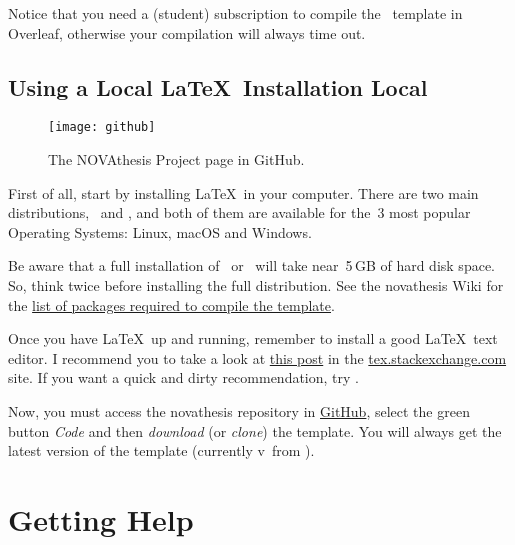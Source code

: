 \begin{tcolorbox}[colback=red!8]
	Notice that you need a (student) subscription to compile the \novathesis\ template in Overleaf, otherwise your compilation will always time out.
\end{tcolorbox}

\subsection{Using a Local \LaTeX\ Installation Local}
\label{sub:using_local_latex}


\begin{wrapfigure}{r}{0.3\linewidth}
\vspace*{-7ex}
\texttt{[image: github]}%
\caption{The NOVAthesis Project page in GitHub.}
\label{fig:github2}
\end{wrapfigure}

First of all, start by installing \LaTeX\ in your computer.  There are two main distributions, \href{https://miktex.org}{\ntindex{\MikTeX}}\ and \href{https://www.tug.org/texlive/}{\ntindex{\TeXLive}}, and both of them are available for the~3 most popular Operating Systems: Linux, macOS and Windows.

Be aware that a full installation of \MikTeX\ or \TeXLive\ will take near~5\,GB of hard disk space.  So, think twice before installing the full distribution.  See the \gls{novathesis} Wiki for the \href{https://github.com/joaomlourenco/novathesis/wiki/installing-latex#minimal-installation-in-any-of-the-systems-above}{list of packages required to compile the template}.

Once you have \LaTeX\ up and running, remember to install a good \LaTeX\ text editor.  I recommend you to take a look at  \href{https://tex.stackexchange.com/questions/339/latex-editors-ides}{this post} in the \url{tex.stackexchange.com} site.  If you want a quick and dirty recommendation, try \href{https://www.texstudio.org/}{}.

Now, you must access the \gls{novathesis} repository in \href{https://github.com/joaomlourenco/novathesis}{GitHub}, select the green button \emph{Code} and then \emph{download} (or \emph{clone}) the template.  You will always get the latest version of the template (currently v\novathesisversion\ from \novathesisdate).


\section{Getting Help}
\label{sec:getting_help}

